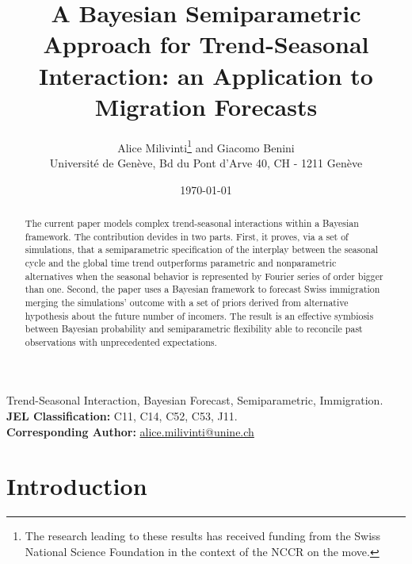 \documentclass{article}\usepackage[]{graphicx}\usepackage[]{color}
\title{A Bayesian Semiparametric Approach for Trend-Seasonal Interaction: an Application to Migration Forecasts}
\author{Alice Milivinti\thanks{The research leading to these results has received funding from the Swiss National Science Foundation in the context of the NCCR on the move.} and Giacomo Benini \\[2mm]
 Universit\'{e} de Gen\`{e}ve, Bd du Pont d'Arve 40, CH - 1211 Gen\`{e}ve}
\date{\today}
\begin{document}

\maketitle
\onehalfspacing


\begin{abstract}
The current paper models complex trend-seasonal interactions within a Bayesian framework. The contribution devides in two parts. First, it proves, via a set of simulations, that a semiparametric specification of the interplay between the seasonal cycle and the global time trend outperforms parametric and nonparametric alternatives when the seasonal behavior is represented by Fourier series of order bigger than one. Second, the paper uses a Bayesian framework to forecast Swiss immigration merging the simulations' outcome with a set of priors derived from alternative hypothesis about the future number of incomers. The result is an effective symbiosis between Bayesian probability and semiparametric flexibility able to reconcile past observations with unprecedented expectations. 

\end{abstract}

 Trend-Seasonal Interaction, Bayesian Forecast, Semiparametric, Immigration. \\
{\bf JEL Classification:} C11, C14, C52, C53, J11.\\  
{\bf Corresponding Author:} \href{mailto:alice.milivinti@unine.ch}{alice.milivinti@unine.ch}

\newpage





\section{Introduction}\label{Introduction}
\end{document}
